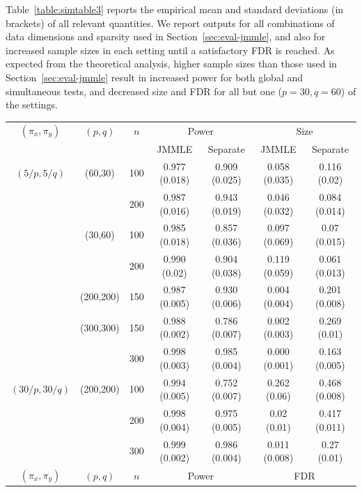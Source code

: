 Table~\ref{table:simtable3} reports the empirical mean and standard deviations (in brackets) of all relevant quantities. We report outputs for all combinations of data dimensions and sparsity used in Section~\ref{sec:eval-jmmle}, and also for increased sample sizes in each setting until a satisfactory FDR is reached. As expected from the theoretical analysis, higher sample sizes than those used in Section~\ref{sec:eval-jmmle} result in increased power for both global and simultaneous tests, and decreased size and FDR for all but one ($p=30, q=60$) of the settings.

%
\begin{scriptsize}
\begin{table}
    \begin{tabular}{ccccccc}
    \hline
$(\pi_x, \pi_y)$ & $(p,q)$   & $n$ & \multicolumn{2}{c}{Power} & \multicolumn{2}{c}{Size}\\\cline{4-7}
 & & & JMMLE     & Separate			   & JMMLE         & Separate           \\ \hline
    $(5/p, 5/q)$ & (60,30)   & 100 & 0.977 (0.018) & 0.909 (0.025) & 0.058 (0.035) & 0.116 (0.02) \\
    ~            & ~         & 200 & 0.987 (0.016) & 0.943 (0.019) & 0.046 (0.032) & 0.084 (0.014) \\
    ~            & (30,60)   & 100 & 0.985 (0.018) & 0.857 (0.036) & 0.097 (0.069) & 0.07  (0.015)  \\
    ~            & ~         & 200 & 0.990 (0.02)  & 0.904 (0.038) & 0.119 (0.059) & 0.061 (0.013) \\
    ~            & (200,200) & 150 & 0.987 (0.005) & 0.930 (0.006) & 0.004 (0.004) & 0.201 (0.008) \\
    ~            & (300,300) & 150 & 0.988 (0.002) & 0.786 (0.007) & 0.002 (0.003) & 0.269 (0.01) \\
    ~            & ~         & 300 & 0.998 (0.003) & 0.985 (0.004) & 0.000 (0.001) & 0.163 (0.005) \\ \hline
  $(30/p, 30/q)$ & (200,200) & 100 & 0.994 (0.005) & 0.752 (0.007) & 0.262 (0.06)  & 0.468 (0.008) \\
    ~            & ~         & 200 & 0.998 (0.004) & 0.975 (0.005) & 0.02 (0.01)   & 0.417 (0.011) \\
    ~            & ~         & 300 & 0.999 (0.002) & 0.986 (0.004) & 0.011 (0.008) & 0.27 (0.01) \\ \hline\hline
$(\pi_x, \pi_y)$ & $(p,q)$   & $n$ & \multicolumn{2}{c}{Power} & \multicolumn{2}{c}{FDR}\\\cline{4-7}

\end{tabular}
\end{table}
\end{scriptsize}
